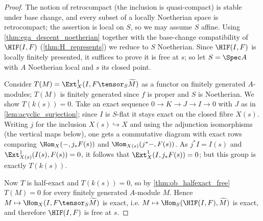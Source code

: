 \begin{theorem}
  \begin{proof}
    The notion of retrocompact (the inclusion is quasi-compact) is stable under
    base change, and every subset of a locally Noetherian space is retrocompact;
    the assertion is local on $S$, so we may assume $S$ affine. Using
    \cref{thm:ega_descent_noetherian} together with the base-change compatibility
    of $\HIF(I,F)$ (\cref{thm:H_represents}) we reduce to $S$ Noetherian. Since
    $\HIF(I,F)$ is locally finitely presented, it suffices to prove it is free at
    $s$; so let $S = \Spec A$ with $A$ Noetherian local and $s$ its closed point.

    Consider $T(M) = \Ext^1_X(I, F \tensor_S \widetilde M)$ as a functor on
    finitely generated $A$-modules; $T(M)$ is finitely generated since $f$ is
    proper and $S$ is Noetherian. We show $T(k(s)) = 0$. Take an exact sequence
    $0 \to K \to J \to I \to 0$ with $J$ as in \cref{lem:acyclic_surjection};
    since $I$ is $S$-flat it stays exact on the closed fibre $X(s)$. Writing $j$
    for the inclusion $X(s) \hookrightarrow X$ and using the adjunction
    isomorphisms (the vertical maps below), one gets a commutative diagram with
    exact rows comparing $\Hom_X(-, j_*F(s))$ and $\Hom_{X(s)}(j^*-, F(s))$. As
    $j^* I = I(s)$ and $\Ext^1_{X(s)}(I(s),F(s)) = 0$, it follows that
    $\Ext^1_X(I, j_*F(s)) = 0$; but this group is exactly $T(k(s))$.

    Now $T$ is half-exact and $T(k(s)) = 0$, so by \cref{thm:ob_halfexact_free}
    $T(M) = 0$ for every finitely generated $A$-module $M$. Hence
    $M \mapsto \Hom_X(I, F \tensor_S \widetilde M)$ is exact, i.e.
    $M \mapsto \Hom_S(\HIF(I,F), \widetilde M)$ is exact, and therefore
    $\HIF(I,F)$ is free at $s$.
  \end{proof}
\end{theorem}


